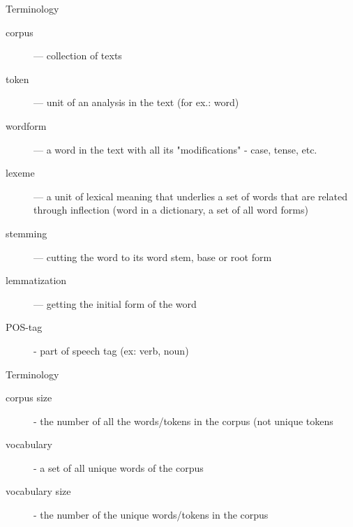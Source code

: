 \documentclass{beamer}
\begin{document}
    \begin{frame}{Terminology}
          \begin{description}
  \item[corpus] —  collection of texts
  \item[token] — unit of an analysis in the text (for ex.: word)
  \item[wordform] — a word in the text with all its "modifications" - case, tense, etc.
  \item[lexeme] —  a unit of lexical meaning that underlies a set of words that are related through inflection (word in a dictionary, a set of all word forms)
  \item[stemming] — cutting the word to its word stem, base or root form
  \item[lemmatization] — getting the initial form of the word
  \item[POS-tag] - part of speech tag (ex: verb, noun)
  \end{description}
    \end{frame}

       \begin{frame}{Terminology}
          \begin{description}
              \item[corpus size] - the number of all the words/tokens in the corpus (not unique tokens
              \item[vocabulary] - a set of all unique words of the corpus
              \item[vocabulary size] - the number of the unique words/tokens in the corpus
  \end{description}
    \end{frame}
\end{document}
